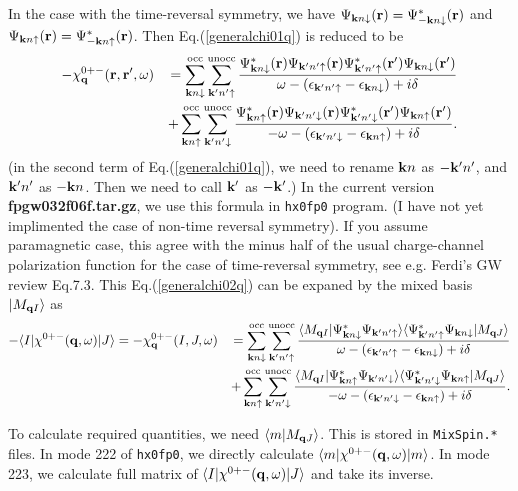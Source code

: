 \documentclass[a4paper,10pt,epsf,fleqn]{article}
\newcommand{\bfq}{{\bf q}}
\newcommand{\bfk}{{\bf k}}
\newcommand{\bfr}{{\bf r}}
\newcommand{\ispone}{\downarrow}
\newcommand{\isptwo}{\uparrow}
\newcommand{\req}[1]{Eq.(\ref{#1})}
\begin{document}
{{{In the case with the time-reversal symmetry, 
we have $\Psi_{\bfk n\ispone}(\bfr) = \Psi_{-\bfk n\ispone}^*(\bfr)$
and $\Psi_{\bfk n\isptwo}(\bfr) = \Psi_{-\bfk n\isptwo}^*(\bfr)$.
Then \req{generalchi01q} is reduced to be
\begin{eqnarray}
-\chi^{0+-}_\bfq(\bfr,\bfr',\omega) 
&&=
 \sum^{\rm occ}_{\bfk n \ispone} \sum^{\rm unocc}_{\bfk' n'\isptwo}
\frac{
\Psi_{\bfk n\ispone}^*(\bfr)      \Psi_{\bfk' n'\isptwo}(\bfr)
\Psi_{\bfk' n'\isptwo}^*(\bfr') \Psi_{\bfk n\ispone}(\bfr') 
}{\omega-(\epsilon_{\bfk' n'\isptwo}-\epsilon_{\bfk n\ispone})+i \delta} \nonumber\\
&&
+ \sum^{\rm occ}_{\bfk n \isptwo} \sum^{\rm unocc}_{\bfk' n'\ispone}
\frac{
\Psi_{\bfk n\isptwo}^*(\bfr)      \Psi_{\bfk' n'\ispone}(\bfr)
\Psi_{\bfk' n'\ispone}^*(\bfr') \Psi_{\bfk n\isptwo}(\bfr')}{-\omega-(\epsilon_{\bfk' n'\ispone}-\epsilon_{\bfk n\isptwo})+i \delta}.
\label{generalchi02q}
\end{eqnarray}
(in the second term of \req{generalchi01q}, 
we need to rename $\bfk n$ as $-\bfk' n'$, and $\bfk' n'$ as $-\bfk n$. Then 
we need to call $\bfk'$ as $-\bfk'$.) 
In the current version {\bf fpgw032f06f.tar.gz}, we use this formula in {\tt hx0fp0} program.
(I have not yet implimented the case of non-time reversal symmetry).
If you assume paramagnetic case, 
this agree with the minus half of the usual charge-channel polarization 
function for the case of time-reversal symmetry,
see e.g. Ferdi's GW review Eq.7.3.
This \req{generalchi02q} can be expaned by the mixed basis 
$|M_{\bfq I} \rangle$ as
\begin{eqnarray}
-\langle I|\chi^{0+-}(\bfq,\omega) | J \rangle=
-\chi^{0+-}_\bfq(I,J,\omega) 
&&=
 \sum^{\rm occ}_{\bfk n \ispone} \sum^{\rm unocc}_{\bfk' n'\isptwo}
\frac{
\langle M_{\bfq I} | \Psi_{\bfk n\ispone}^* \Psi_{\bfk' n'\isptwo} \rangle
\langle \Psi_{\bfk' n'\isptwo}^* \Psi_{\bfk n\ispone} | M_{\bfq J} \rangle
}{\omega-(\epsilon_{\bfk' n'\isptwo}-\epsilon_{\bfk n\ispone})+i \delta} \nonumber\\
&&
+ \sum^{\rm occ}_{\bfk n \isptwo} \sum^{\rm unocc}_{\bfk' n'\ispone}
\frac{
\langle M_{\bfq I} |\Psi_{\bfk n\isptwo}^* \Psi_{\bfk' n'\ispone} \rangle
\langle \Psi_{\bfk' n'\ispone}^* \Psi_{\bfk n\isptwo} | M_{\bfq J} \rangle }
{-\omega-(\epsilon_{\bfk' n'\ispone}-\epsilon_{\bfk n\isptwo})+i \delta}.
\label{generalchi03q}
\end{eqnarray}

To calculate required quantities,
we need $\langle m| M_{\bfq J} \rangle$. This is stored in {\tt MixSpin.*} files.
In mode 222 of {\tt hx0fp0}, we directly calculate $\langle m|\chi^{0+-}(\bfq,\omega) | m \rangle$.
In mode 223, we calculate full matrix of $\langle I|\chi^{0+-}(\bfq,\omega) | J \rangle$
and take its inverse.


}}}
\end{document}
